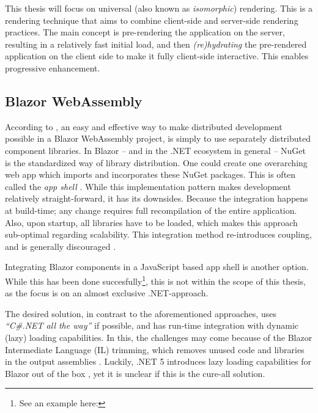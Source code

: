 This thesis will focus on universal (also known as \textit{isomorphic})
rendering. This is a rendering technique that aims to combine client-side and
server-side rendering practices. The main concept is pre-rendering the
application on the server, resulting in a relatively fast initial load, and then
\textit{(re)hydrating} the pre-rendered application on the client side to make
it fully client-side interactive. This enables progressive enhancement.
\autocite{MillerOsmani_2019}

\subsection{Blazor WebAssembly}
According to \textcite{Rappl_MunichNETMeetup_2020}, an easy and effective way to
make distributed development possible in a Blazor WebAssembly project, is simply
to use separately distributed component libraries. In Blazor -- and in the .NET
ecosystem in general -- NuGet is the
standardized way of library distribution. One could create one overarching web
app which imports and incorporates these NuGet packages. This is often called
the \textit{app shell} \autocite{Geers_2020}. While this implementation pattern
makes development relatively straight-forward, it has its downsides. Because the
integration happens at build-time; any change requires full recompilation of the
entire application. Also, upon startup, all libraries have to be loaded, which
makes this approach sub-optimal regarding scalability. This integration method
re-introduces coupling, and is generally discouraged \autocite{Jackson_2019}.

Integrating Blazor components in a JavaScript based app shell is another option.
While this has been done succesfully\footnote{See an example here:
}, this is
not within the scope of this thesis, as the focus is on an almost exclusive
.NET-approach.

The desired solution, in contrast to the aforementioned approaches, uses
\textit{``C\#.NET all the way''} if possible, and has run-time integration with
dynamic (lazy) loading capabilities. In this, the challenges may come because of
the Blazor Intermediate Language (IL) trimming, which removes unused code and
libraries in the output assemblies \autocite{Latham_2020}. Luckily, .NET 5
introduces lazy loading capabilities for Blazor out of the box
\autocite{Kdouh_2020} \autocite{Rappl_dotNETConf_2020}, yet it is unclear if
this is the cure-all solution.

